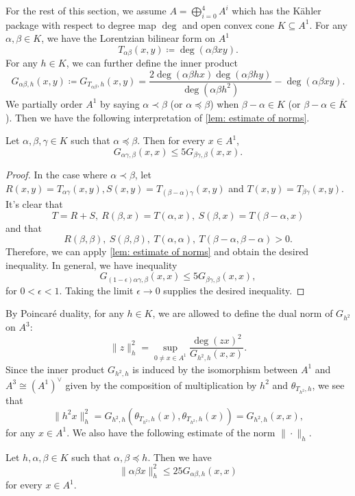For the rest of this section, we assume $A=\bigoplus_{i=0}^4 A^i$ which has the K\"ahler package with respect to degree map $\deg$ and open convex cone $K\subseteq A^1$. For any $\alpha,\beta\in K$, we have the Lorentzian bilinear form on $A^1$
\[
    T_{\alpha\beta}(x,y)\coloneqq \deg(\alpha\beta xy).
\]
For any $h\in K$, we can further define the inner product
\[
    G_{\alpha\beta,h}(x,y)\coloneqq G_{T_{\alpha\beta},h}(x,y)=\frac{2 \deg(\alpha\beta h x)\deg(\alpha\beta h y)}{\deg(\alpha\beta h^2)}-\deg(\alpha\beta x y).
\]
We partially order $A^1$ by saying $\alpha \prec \beta$  (or $\alpha \preceq \beta$) when $\beta-\alpha\in K$ (or $\beta-\alpha\in \overline{K}$). Then we have the following interpretation of \cref{lem: estimate of norms}.
\begin{lemma} \label{lem: estimate of norms revisited}
    Let $\alpha,\beta,\gamma\in K$ such that $\alpha\preceq\beta$. Then for every $x\in A^1$,
    \[
        G_{\alpha \gamma,\beta}(x,x)\leq 5G_{\beta \gamma,\beta}(x,x).
    \]
\end{lemma}
\begin{proof}
    In the case where $\alpha\prec \beta$, let $R(x,y)=T_{\alpha \gamma}(x,y), S(x,y)=T_{(\beta-\alpha)\gamma}(x,y)$ and $T(x,y)=T_{\beta \gamma}(x,y)$. It's clear that
    \[
        T=R+S,\ R(\beta,x)=T(\alpha,x),\ S(\beta,x)=T(\beta-\alpha,x)
    \]
    and that
    \[
        R(\beta,\beta),\ S(\beta,\beta),\ T(\alpha,\alpha),\ T(\beta-\alpha,\beta-\alpha)>0.
    \]
    Therefore, we can apply \cref{lem: estimate of norms} and obtain the desired inequality.
    In general, we have inequality
    \[
        G_{(1-\epsilon)\alpha \gamma,\beta}(x,x)\leq 5G_{\beta \gamma,\beta}(x,x),
    \]
    for $0<\epsilon<1$. Taking the limit $\epsilon\to 0$ supplies the desired inequality.
\end{proof}
By Poincar\'e duality, for any $h\in K$, we are allowed to define the dual norm of $G_{h^2}$ on $A^3$:
\[
    \|z\|_{h}^2=\sup_{0\neq x\in A^1}\frac{\deg(zx)^2}{G_{h^2,h}(x,x)}.
\]
Since the inner product $G_{h^2,h}$ is induced by the isomorphism between $A^1$ and $A^3\cong (A^1)^\vee $ given by the composition of multiplication by $h^2$ and $\theta_{T_{h^2},h}$, we see that
\[
    \|h^2x\|_h^2=G_{h^2,h}(\theta_{T_{h^2},h}(x),\theta_{T_{h^2},h}(x))=G_{h^2,h}(x,x),
\]
for any $x\in A^1$. We also have the following estimate of the norm $\|\cdot\|_{h}$.
\begin{lemma}\label{lem: estimate of external norm}
    Let $h,\alpha,\beta\in K$ such that $\alpha,\beta\preceq h$. Then we have
    \[
        \|\alpha\beta x\|_h^2\leq 25 G_{\alpha\beta,h}(x,x)
    \]
    for every $x\in A^1$.
\end{lemma}


